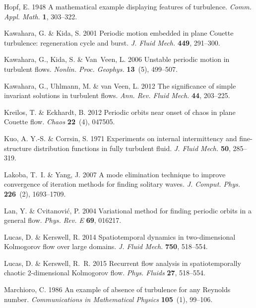 \documentclass{jfm}
\begin{document}
\begin{thebibliography}{68}
{\sc Hopf, E.} 1948 A mathematical example displaying features of turbulence.
  {\em Comm. Appl. Math.\/} {\bf 1}, 303--322.

{\sc Kawahara, G. \& Kida, S.} 2001 Periodic motion embedded in plane {C}ouette
  turbulence: regeneration cycle and burst. {\em J. Fluid Mech.\/} {\bf 449},
  291--300.

{\sc Kawahara, G., Kida, S. \& Van~Veen, L.} 2006 Unstable periodic motion in
  turbulent flows. {\em Nonlin. Proc. Geophys.\/} {\bf 13}~(5), 499--507.

{\sc Kawahara, G., Uhlmann, M. \& van Veen, L.} 2012 The significance of simple
  invariant solutions in turbulent flows. {\em Ann. Rev. Fluid Mech.\/} {\bf
  44}, 203--225.

{\sc Kreilos, T. \& Eckhardt, B.} 2012 Periodic orbits near onset of chaos in
  plane {C}ouette flow. {\em Chaos\/} {\bf 22}~(4), 047505.

{\sc Kuo, A. Y.-S. \& Corrsin, S.} 1971 Experiments on internal intermittency
  and fine-structure distribution functions in fully turbulent fluid. {\em J.
  Fluid Mech.\/} {\bf 50}, 285--319.

{\sc Lakoba, T.~I. \& Yang, J.} 2007 A mode elimination technique to improve
  convergence of iteration methods for finding solitary waves. {\em J. Comput.
  Phys.\/} {\bf 226}~(2), 1693--1709.

{\sc Lan, Y. \& Cvitanovi\'{c}, P.} 2004 Variational method for finding
  periodic orbits in a general flow. {\em Phys. Rev. E\/} {\bf 69}, 016217.

{\sc Lucas, D. \& Kerswell, R.} 2014 Spatiotemporal dynamics in two-dimensional
  {Kolmogorov} flow over large domains. {\em J. Fluid Mech.\/} {\bf 750},
  518--554.

{\sc Lucas, D. \& Kerswell, R.~R.} 2015 Recurrent flow analysis in
  spatiotemporally chaotic 2-dimensional {Kolmogorov} flow. {\em Phys.
  Fluids\/} {\bf 27}, 518--554.

{\sc Marchioro, C.} 1986 An example of absence of turbulence for any {R}eynolds
  number. {\em Communications in Mathematical Physics\/} {\bf 105}~(1),
  99--106.


\end{thebibliography}
\end{document}
